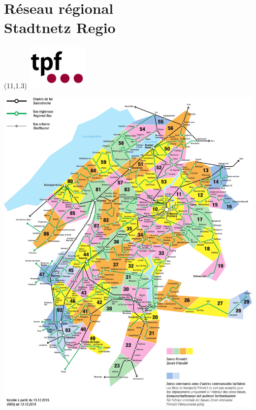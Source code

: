 \section*{Réseau régional\\Stadtnetz Regio}
\begin{textblock}{2}(11,1.3)
\includegraphics[width=3cm]{tpf.pdf}
\end{textblock}
\begin{center}
\includegraphics[width=\textwidth]{plan_regional.png}
\end{center}
\clearpage%
\thispagestyle{empty}%
